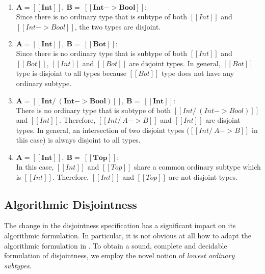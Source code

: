 \begin{enumerate}
  \item $\boldsymbol{A = [[Int]], \ B = \ [[Int -> Bool]]:}$ \\
        Since there is no ordinary type that is subtype of both $[[Int]]$ and $[[Int -> Bool]]$,
        the two types are disjoint.
  \item $\boldsymbol{A = [[Int]], \ B = \ [[Bot]]:}$ \\
    Since there is no ordinary type that is subtype of both $[[Int]]$ and $[[Bot]]$,
    $[[Int]]$ and $[[Bot]]$ are disjoint types.
    In general, $[[Bot]]$ type is disjoint to all types because $[[Bot]]$ type does not
    have any ordinary subtype.
  \item $\boldsymbol{A = [[Int /\ (Int -> Bool)]], \ B = \ [[Int]]:}$ \\
        There is no ordinary type that is subtype of both $[[Int /\ (Int -> Bool)]]$ and $[[Int]]$.
        Therefore, $[[Int /\ A -> B]]$ and $[[Int]]$ are disjoint types.
        In general, an intersection of two disjoint types ($[[Int /\ A -> B]]$ in this case)
        is always disjoint to all types.
  \item $\boldsymbol{A = [[Int]], \ B = \ [[Top]]:}$ \\
        In this case, $[[Int]]$ and $[[Top]]$ share a common ordinary subtype which is $[[Int]]$.
        Therefore, $[[Int]]$ and $[[Top]]$ are not disjoint types.
\end{enumerate}


\subsection{Algorithmic Disjointness}

The change in the disjointness specification has a significant impact on its
algorithmic formulation. In particular, it is not obvious at all how to adapt
the algorithmic formulation in . To obtain a
sound, complete and decidable formulation of disjointness, we employ the novel
notion of \emph{lowest ordinary subtypes}.

